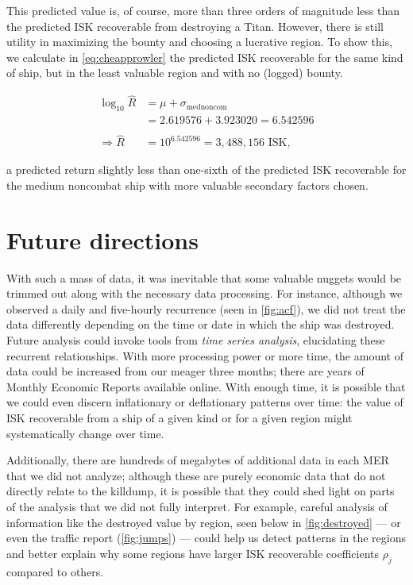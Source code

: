 \documentclass[letterpaper,12pt,article]{memoir}
\begin{document}
This predicted value is, of course, more than three orders of magnitude less than
the predicted ISK recoverable from destroying a Titan. However, there is still 
utility in maximizing the bounty and choosing a lucrative region. To show this, we
calculate in \cref{eq:cheapprowler} the predicted ISK recoverable for the same kind
of ship, but in the least valuable region and with no (logged) bounty.

\begin{equation} \label{eq:cheapprowler}
\begin{aligned}
    \log_{10}{\widehat{R}} &= \mu + \sigma_{\textrm{mednoncom}} \\
    &= 2.619576 + 3.923020 = 6.542596 \\
    & \\
    \Rightarrow \widehat{R} &= 10^{6.542596} = 3,488,156 \textrm{ ISK},
\end{aligned}
\end{equation}

a predicted return slightly less than one-sixth of the predicted ISK recoverable
for the medium noncombat ship with more valuable secondary factors chosen.

\section{Future directions}

With such a mass of data, it was inevitable that some valuable nuggets would be
trimmed out along with the necessary data processing. For instance, although we
observed a daily and five-hourly recurrence (seen in \cref{fig:acf}), we did not
treat the data differently depending on the time or date in which the ship was
destroyed. Future analysis could invoke tools from \textit{time series analysis},
elucidating these recurrent relationships. With more processing power or more time,
the amount of data could be increased from our meager three months; there are years
of Monthly Economic Reports available online. With enough time, it is possible that
we could even discern inflationary or deflationary patterns over time: the value of
ISK recoverable from a ship of a given kind or for a given region might 
systematically change over time.

Additionally, there are hundreds of megabytes of additional data in each MER that
we did not analyze; although these are purely economic data that do not directly
relate to the killdump, it is possible that they could shed light on parts of the
analysis that we did not fully interpret. For example, careful analysis of 
information like the destroyed value by region, seen below in \cref{fig:destroyed} 
--- or even the traffic report (\cref{fig:jumps}) --- could help us detect patterns
in the regions and better explain why some regions have larger ISK recoverable
coefficients $\rho_j$ compared to others.
\end{document}
